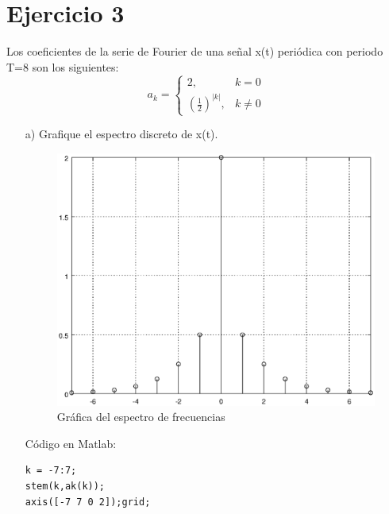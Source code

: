\documentclass[a4paper,12pt]{article}
\begin{document}
\section{Ejercicio 3}
Los coeficientes de la serie de Fourier de una señal x(t) periódica con periodo T=8 son los siguientes:
\[ a_k =\begin{cases}
            2, & k = 0 \\
            \left(\frac{1}{2}\right)^{|k|}, & k \neq 0
        \end{cases}
 \]
    \begin{itemize}
        \item[a)] Grafique el espectro discreto de x(t).
        \begin{multicols}{2}
            \begin{figure}[H]
                \begin{center}
                    \includegraphics[width=\linewidth]{espectro1}
                    \caption{Gráfica del espectro de frecuencias}
                    \label{fig:espectro1}
                \end{center}
            \end{figure}
        \columnbreak
        Código en Matlab:
        
            \begin{lstlisting}
k = -7:7;
stem(k,ak(k));
axis([-7 7 0 2]);grid;
            \end{lstlisting}
        \end{multicols}
        

\end{itemize}
\end{document}

